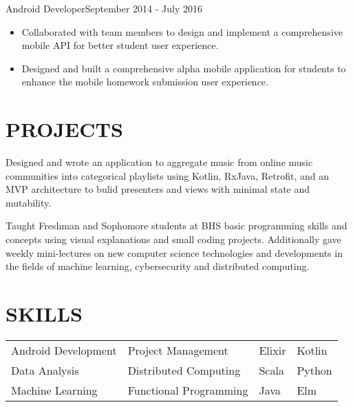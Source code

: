 \documentclass[10pt]{article}
\begin{document}
                  	 
                {Android Developer}{September 2014 - July 2016}
                 			\begin{itemize}					        
                   			\item Collaborated with team members to design and implement a comprehensive mobile API for better student user experience.
                   			\item Designed and built a comprehensive alpha mobile application for students to enhance the mobile homework submission user experience.
                  		 \end{itemize}
                  		 
                  
\section*{PROJECTS}
                 {Designed and wrote an application to aggregate music from online music communities into categorical playlists using Kotlin, RxJava, Retrofit, and an MVP architecture to bulid presenters and views with minimal state and mutability.}
                
							{Taught Freshman and Sophomore students at BHS basic programming skills and concepts using visual explanations and small coding projects. Additionally gave weekly mini-lectures on new computer science technologies and developments in the fields of machine learning, cybersecurity and distributed computing.}

\section*{SKILLS}
				\setlength{\columnsep}{1pt}
				\begin{tabu}{X[2c]X[2c]X[c]X[c]}
					Android Development  & Project Management & Elixir& Kotlin \\
					Data Analysis 			   & Distributed Computing & Scala & Python \\
					Machine Learning		   & Functional Programming & Java & Elm \\
				\end{tabu}
 
\end{document}
